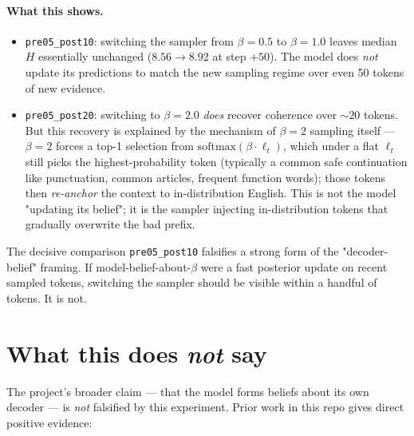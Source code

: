 \documentclass[11pt]{article}
\begin{document}
\paragraph{What this shows.}

\begin{itemize}
\item \texttt{pre05\_post10}: switching the sampler from $\beta=0.5$ to
$\beta=1.0$ leaves median $H$ essentially unchanged ($8.56 \to 8.92$ at
step $+50$).  The model does \emph{not} update its predictions to match
the new sampling regime over even 50 tokens of new evidence.

\item \texttt{pre05\_post20}: switching to $\beta=2.0$ \emph{does} recover
coherence over $\sim 20$ tokens.  But this recovery is explained by the
mechanism of $\beta=2$ sampling itself --- $\beta=2$ forces a top-1
selection from $\mathrm{softmax}(\beta \cdot \ell_t)$, which under a flat
$\ell_t$ still picks the highest-probability token (typically a common safe
continuation like punctuation, common articles, frequent function words);
those tokens then \emph{re-anchor} the context to in-distribution English.
This is not the model "updating its belief"; it is the sampler injecting
in-distribution tokens that gradually overwrite the bad prefix.
\end{itemize}

The decisive comparison \texttt{pre05\_post10} falsifies a strong form of
the "decoder-belief" framing.  If model-belief-about-$\beta$ were a fast
posterior update on recent sampled tokens, switching the sampler should be
visible within a handful of tokens.  It is not.

\section{What this does \emph{not} say}

The project's broader claim --- that the model forms beliefs about its
own decoder --- is \emph{not} falsified by this experiment.  Prior work in
this repo gives direct positive evidence:
\end{document}
